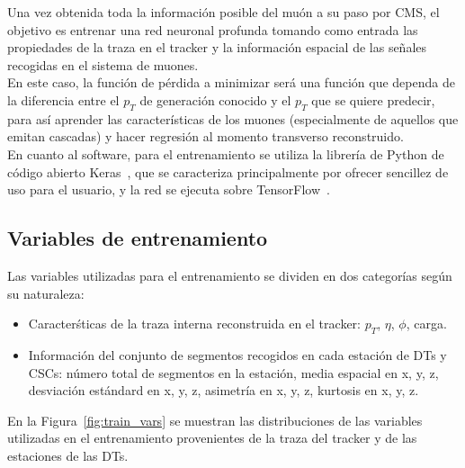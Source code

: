 
Una vez obtenida toda la informaci\'on posible del mu\'on a su paso por CMS, el objetivo es entrenar una red neuronal profunda tomando como entrada las propiedades de la traza en el tracker y la informaci\'on espacial de las se\~nales recogidas en el sistema de muones. \\
En este caso, la funci\'on de p\'erdida a minimizar ser\'a una funci\'on que dependa de la diferencia entre el $p_{T}$ de generaci\'on conocido y el $p_{T}$ que se quiere predecir, para as\'i aprender las caracter\'isticas de los muones (especialmente de aquellos que emitan cascadas) y hacer regresi\'on al momento transverso reconstruido. \\

En cuanto al software, para el entrenamiento se utiliza la librer\'ia de Python de c\'odigo abierto Keras~\cite{chollet2015keras}, que se caracteriza principalmente por ofrecer sencillez de uso para el usuario, y la red se ejecuta sobre TensorFlow~\cite{tensorflow2015-whitepaper}.


\subsection{Variables de entrenamiento}\label{sec:variables}

Las variables utilizadas para el entrenamiento se dividen en dos categor\'ias seg\'un su naturaleza:

\begin{itemize}
\item Caracter\'sticas de la traza interna reconstruida en el tracker: $p_{T}$, $\eta$, $\phi$, carga.
\item Informaci\'on del conjunto de segmentos recogidos en cada estaci\'on de DTs y CSCs: n\'umero total de segmentos en la estaci\'on, media espacial en x, y, z, desviaci\'on est\'andard en x, y, z, asimetr\'ia en x, y, z, kurtosis en x, y, z.
\end{itemize}

En la Figura~\ref{fig:train_vars} se muestran las distribuciones de las variables utilizadas en el entrenamiento provenientes de la traza del tracker y de las estaciones de las DTs.

